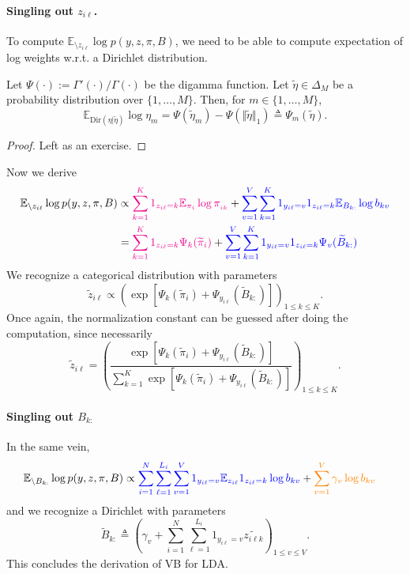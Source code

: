 \paragraph{Singling out $z_{i\ell}$.}
To compute $\mathbb{E}_{\setminus z_{i\ell}} \log p(y,z,\pi, B)$, we need to be able to compute expectation of log weights w.r.t. a Dirichlet distribution.
\begin{lemma}
Let $\Psi(\cdot) := \Gamma'(\cdot)/\Gamma(\cdot)$ be the digamma function.
Let $\widetilde\eta\in \Delta_M$ be a probability distribution over $\{1,\dots, M\}$.
Then, for $m\in \{1,\dots, M\}$,
$$
  \mathbb{E}_{\text{Dir}(\eta\vert\widetilde\eta)} \log \eta_m = \Psi(\widetilde\eta_m) - \Psi(\Vert \widetilde\eta\Vert_1) \triangleq \Psi_m(\widetilde{\eta}).
$$
\end{lemma}
\begin{proof}
  Left as an exercise.
\end{proof}

Now we derive
\begin{align*}
  \mathbb{E}_{\setminus z_{i\ell}} \log p(y,z,\pi, B)
    &\propto  \textcolor{magenta}{\sum_{k=1}^K  1_{z_{i\ell}=k} \mathbb{E}_{\pi_i}\log\pi_{_{ik}}}
    + \textcolor{blue}{\sum_{v=1}^V \sum_{k=1}^K 1_{y_{i\ell}=v} 1_{z_{i\ell}=k} \mathbb{E}_{B_{k:}}\log b_{kv} }\\
    &=  \textcolor{magenta}{\sum_{k=1}^K  1_{z_{i\ell}=k} \Psi_k(\widetilde\pi_{i})}
    + \textcolor{blue}{\sum_{v=1}^V \sum_{k=1}^K 1_{y_{i\ell}=v} 1_{z_{i\ell}=k} \Psi_v(\widetilde{B}_{k:}) }
\end{align*}
We recognize a categorical distribution with parameters
$$
\widetilde{z}_{i\ell} \propto \left( \exp\left[\Psi_k(\widetilde\pi_{i}) +  \Psi_{y_{i\ell}}(\widetilde{B}_{k:})\right]\right)_{1\leq k \leq K}.
$$
Once again, the normalization constant can be guessed after doing the computation, since necessarily
$$
  \widetilde{z}_{i\ell} =
    \left(
      \frac{\exp\left[\Psi_k(\widetilde\pi_{i}) +  \Psi_{y_{i\ell}}(\widetilde{B}_{k:})\right]}
      {\sum_{k=1}^K \exp\left[\Psi_k(\widetilde\pi_{i}) +  \Psi_{y_{i\ell}}(\widetilde{B}_{k:})\right]}
    \right)_{1\leq k \leq K}.
$$

\paragraph{Singling out $B_{k:}$}
In the same vein,
\begin{align*}
  \mathbb{E}_{\setminus B_{k:}} \log p(y,z,\pi, B)
    &\propto \textcolor{blue}{\sum_{i=1}^N\sum_{\ell=1}^{L_i}\sum_{v=1}^V 1_{y_{i\ell}=v} \mathbb{E}_{z_{i\ell}} 1_{z_{i\ell}=k} \log b_{kv} } + \textcolor{orange}{\sum_{v=1}^V \gamma_v\log b_{kv}}
\end{align*}
and we recognize a Dirichlet with parameters
$$
\widetilde{B}_{k:} \triangleq \left (\gamma_v + \sum_{i=1}^N\sum_{\ell=1}^{L_i} 1_{y_{i\ell}=v}\widetilde{z_{i\ell k}} \right)_{1\leq v \leq V}.
$$
This concludes the derivation of VB for LDA.

